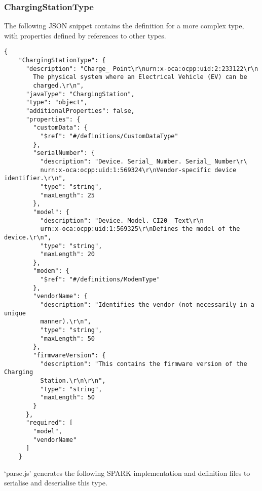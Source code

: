 \documentclass[12pt,openany,a4paper]{book}
\begin{document}
\subsubsection{ChargingStationType}
The following JSON snippet contains the definition for a more complex type, with properties defined by references to other types.
\begin{verbatim}
{
    "ChargingStationType": {
      "description": "Charge_ Point\r\nurn:x-oca:ocpp:uid:2:233122\r\n
      	The physical system where an Electrical Vehicle (EV) can be 
      	charged.\r\n",
      "javaType": "ChargingStation",
      "type": "object",
      "additionalProperties": false,
      "properties": {
        "customData": {
          "$ref": "#/definitions/CustomDataType"
        },
        "serialNumber": {
          "description": "Device. Serial_ Number. Serial_ Number\r\
          nurn:x-oca:ocpp:uid:1:569324\r\nVendor-specific device identifier.\r\n",
          "type": "string",
          "maxLength": 25
        },
        "model": {
          "description": "Device. Model. CI20_ Text\r\n
          urn:x-oca:ocpp:uid:1:569325\r\nDefines the model of the device.\r\n",
          "type": "string",
          "maxLength": 20
        },
        "modem": {
          "$ref": "#/definitions/ModemType"
        },
        "vendorName": {
          "description": "Identifies the vendor (not necessarily in a unique 
          manner).\r\n",
          "type": "string",
          "maxLength": 50
        },
        "firmwareVersion": {
          "description": "This contains the firmware version of the Charging 
          Station.\r\n\r\n",
          "type": "string",
          "maxLength": 50
        }
      },
      "required": [
        "model",
        "vendorName"
      ]
    }
\end{verbatim}

`parse.js' generates the following SPARK implementation and definition files to serialise and deserialise this type.
\end{document}
